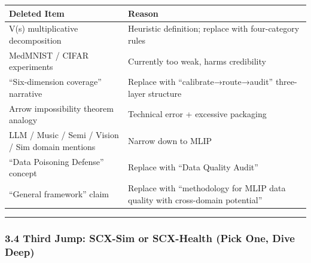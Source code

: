 \documentclass[
  12pt,
]{article}
\begin{document}
\begin{longtable}[]{@{}
  >{\raggedright\arraybackslash}p{}
  >{\raggedright\arraybackslash}p{}@{}}
\toprule\noalign{}
\begin{minipage}[b]{\linewidth}\raggedright
Deleted Item
\end{minipage} & \begin{minipage}[b]{\linewidth}\raggedright
Reason
\end{minipage} \\
\midrule\noalign{}
\endhead
\bottomrule\noalign{}
\endlastfoot
V(s) multiplicative decomposition & Heuristic definition; replace with four-category rules \\
MedMNIST / CIFAR experiments & Currently too weak, harms credibility \\
``Six-dimension coverage'' narrative & Replace with ``calibrate→route→audit'' three-layer structure \\
Arrow impossibility theorem analogy & Technical error + excessive packaging \\
LLM / Music / Semi / Vision / Sim domain mentions & Narrow down to MLIP \\
``Data Poisoning Defense'' concept & Replace with ``Data Quality Audit'' \\
``General framework'' claim & Replace with ``methodology for MLIP data quality with cross-domain potential'' \\
\end{longtable}

\begin{center}\rule{0.5\linewidth}{0.5pt}\end{center}

\subsubsection{3.4 Third Jump: SCX-Sim or SCX-Health (Pick One, Dive Deep)}\label{third-jump-scx-sim-or-scx-health}
\end{document}
